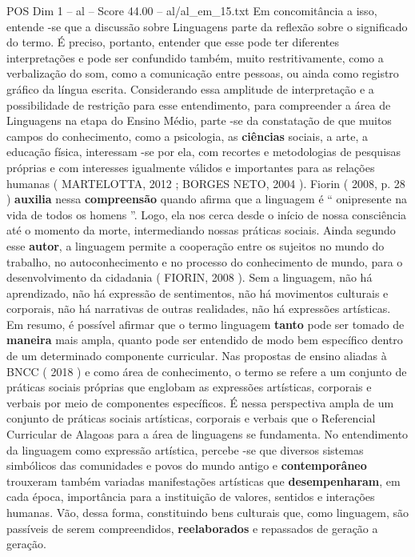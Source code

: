 \begin{textsample}{POS Dim 1 – al – Score 44.00 – al/al\_em\_15.txt}
Em concomitância a isso, entende -se que a discussão sobre Linguagens parte da reflexão sobre o significado do termo.
É preciso, portanto, entender que esse pode ter diferentes interpretações e pode ser confundido também, muito restritivamente, como a verbalização do som, como a comunicação entre pessoas, ou ainda como registro gráfico da língua escrita.
Considerando essa amplitude de interpretação e a possibilidade de restrição para esse entendimento, para compreender a área de Linguagens na etapa do Ensino Médio, parte -se da constatação de que muitos campos do conhecimento, como a psicologia, as \textbf{ciências} sociais, a arte, a educação física, interessam -se por ela, com recortes e metodologias de pesquisas próprias e com interesses igualmente válidos e importantes para as relações humanas ( MARTELOTTA, 2012 ; BORGES NETO, 2004 ).
Fiorin ( 2008, p. 28 ) \textbf{auxilia} nessa \textbf{compreensão} quando afirma que a linguagem é “ onipresente na vida de todos os homens ”.
Logo, ela nos cerca desde o início de nossa consciência até o momento da morte, intermediando nossas práticas sociais.
Ainda segundo esse \textbf{autor}, a linguagem permite a cooperação entre os sujeitos no mundo do trabalho, no autoconhecimento e no processo do conhecimento de mundo, para o desenvolvimento da cidadania ( FIORIN, 2008 ).
Sem a linguagem, não há aprendizado, não há expressão de sentimentos, não há movimentos culturais e corporais, não há narrativas de outras realidades, não há expressões artísticas.
Em resumo, é possível afirmar que o termo linguagem \textbf{tanto} pode ser tomado de \textbf{maneira} mais ampla, quanto pode ser entendido de modo bem específico dentro de um determinado componente curricular.
Nas propostas de ensino aliadas à BNCC ( 2018 ) e como área de conhecimento, o termo se refere a um conjunto de práticas sociais próprias que englobam as expressões artísticas, corporais e verbais por meio de componentes específicos.
É nessa perspectiva ampla de um conjunto de práticas sociais artísticas, corporais e verbais que o Referencial Curricular de Alagoas para a área de linguagens se fundamenta.
No entendimento da linguagem como expressão artística, percebe -se que diversos sistemas simbólicos das comunidades e povos do mundo antigo e \textbf{contemporâneo} trouxeram também variadas manifestações artísticas que \textbf{desempenharam}, em cada época, importância para a instituição de valores, sentidos e interações humanas.
Vão, dessa forma, constituindo bens culturais que, como linguagem, são passíveis de serem compreendidos, \textbf{reelaborados} e repassados de geração a geração.

\end{textsample}

